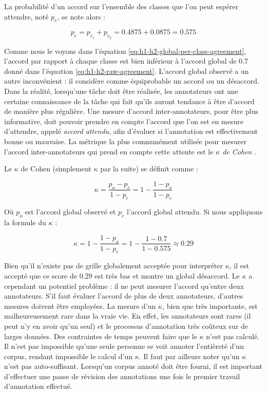 \documentclass[12pt,a4paper,times,twoside,openright]{report}
\begin{document}
La probabilité d'un accord sur l'ensemble des classes que l'on peut espérer attendre, noté $p_{e}$, se note alors :

\begin{equation}\label{eq:h1-h2-global-per-class-agreement}
p_{e} = p_{c_{1}} + p_{c_{2}} = 0.4875 + 0.0875 = 0.575
\end{equation}

Comme nous le voyons dans l'équation \ref{eq:h1-h2-global-per-class-agreement}, l'accord par rapport à chaque classe est bien inférieur à l'accord global de 0.7 donné dans l'équation \ref{eq:h1-h2-raw-agreement}. L'accord global observé a un autre inconvénient : il considère comme équiprobable un accord ou un désaccord. Dans la réalité, lorsqu'une tâche doit être réalisée, les annotateurs ont une certaine connaissance de la tâche qui fait qu'ils auront tendance à être d'accord de manière plus régulière. Une mesure d'accord inter-annotateurs, pour être plus informative, doit pouvoir prendre en compte l'accord que l'on est en mesure d'attendre, appelé \emph{accord attendu}, afin d'évaluer si l'annotation est effectivement bonne ou mauvaise. La métrique la plus communément utilisée pour mesurer l'accord inter-annotateurs qui prend en compte cette attente est le \emph{$\kappa$ de Cohen} \citep{cohen1960coefficient}.

Le $\kappa$ de Cohen (simplement $\kappa$ par la suite) se définit comme :

\begin{equation}\label{eq:kappa-definition}
\kappa = \frac{p_{o} - p_{e}}{1 - p_{e}} = 1 - \frac{1 - p_{o}}{1 - p_{e}}
\end{equation}

Où $p_{o}$ est l'accord global observé et $p_{e}$ l'accord global attendu. Si nous appliquons la formule du $\kappa$ :

\begin{equation}\label{eq:kappa-here}
\kappa = 1 - \frac{1 - p_{o}}{1 - p_{e}} = 1 - \frac{1 - 0.7}{1 - 0.575} \approx 0.29
\end{equation}

Bien qu'il n'existe pas de  grille globalement acceptée pour interpréter $\kappa$, il est accepté que ce score de 0.29 est très bas et montre un global désaccord. Le $\kappa$ a cependant un potentiel problème : il ne peut mesurer l'accord qu'entre deux annotateurs. S'il faut évaluer l'accord de plus de deux annotateurs, d'autres mesures doivent être employées. La mesure d'un $\kappa$, bien que très importante, est malheureusement rare dans la vraie vie. En effet, les annotateurs sont rares (il peut n'y en avoir qu'un seul) et le processus d'annotation très coûteux sur de larges données. Des contraintes de temps peuvent faire que le $\kappa$ n'est pas calculé. Il n'est pas impossible qu'une seule personne se voit annoter l'entièreté d'un corpus, rendant impossible le calcul d'un $\kappa$. Il faut par ailleurs noter qu'un $\kappa$ n'est pas auto-suffisant. Lorsqu'un corpus annoté doit être fourni, il est important d'effectuer une passe de révision des annotations une fois le premier travail d'annotation effectué.
\end{document}
